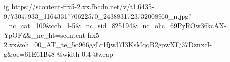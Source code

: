 
 
 
 
 

\ifcmt
  ig https://scontent-frx5-2.xx.fbcdn.net/v/t1.6435-9/73047933_1164331770622570_2438831723732008960_n.jpg?_nc_cat=109&ccb=1-5&_nc_sid=825194&_nc_ohc=69PyROw36kcAX-YpOFZ&_nc_ht=scontent-frx5-2.xx&oh=00_AT_te_5o966ggLr1fjw37I3KsMqqB2gpwXFj37DznxcI-g&oe=61E61B48
  @width 0.4
  @wrap 
\fi
